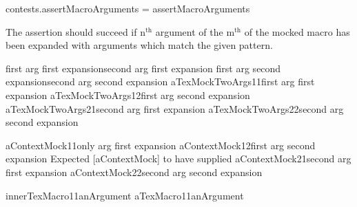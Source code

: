 contests.assertMacroArguments = assertMacroArguments
\stopLuaCode


The \type{\assertMacroNthArgumentOnMthExpansionMatches} assertion should 
succeed if $\text{n}^{\text{th}}$ argument of the $\text{m}^{\text{th}}$ 
of the mocked macro has been expanded with arguments which match the given 
pattern. 

\startConTest
\begingroup
  \aTexMockTwoArgs%
    {first arg first expansion}{second arg first expansion}
  \aTexMockTwoArgs%
    {first arg second expansion}{second arg second expansion}
  \assertMacroNthArgumentOnMthExpansionMatches%
    {aTexMockTwoArgs}{1}{1}{first arg first expansion}{}
  \assertMacroNthArgumentOnMthExpansionMatches%
    {aTexMockTwoArgs}{1}{2}{first arg second expansion}{}
  \assertMacroNthArgumentOnMthExpansionMatches%
    {aTexMockTwoArgs}{2}{1}{second arg first expansion}{}
  \assertMacroNthArgumentOnMthExpansionMatches%
    {aTexMockTwoArgs}{2}{2}{second arg second expansion}{}
\endgroup
\stopConTest
\stopTestCase

\startConTest
\begingroup
  \assertMacroNthArgumentOnMthExpansionMatches%
    {aContextMock}{1}{1}{only arg first expansion}{}
  \assertMacroNthArgumentOnMthExpansionMatches%
    {aContextMock}{1}{2}{first arg second expansion}{}
  \startAssertShouldFail{}%
    {Expected [aContextMock] to have supplied}%
    {}
    \assertMacroNthArgumentOnMthExpansionMatches%
      {aContextMock}{2}{1}{second arg first expansion}{}
  \stopAssertShouldFail
  \assertMacroNthArgumentOnMthExpansionMatches%
    {aContextMock}{2}{2}{second arg second expansion}{}
\endgroup
\stopConTest
\stopTestCase


\startConTest
\begingroup
  \def\aTexMacro#1{\innerTexMacro{#1}}
  \aTexMacro{anArgument}
  \assertMacroNthArgumentOnMthExpansionMatches%
    {innerTexMacro}{1}{1}{anArgument}{}
  \assertMacroNthArgumentOnMthExpansionMatches%
    {aTexMacro}{1}{1}{anArgument}{}
\endgroup
\stopConTest
\stopTestCase

\stopTestSuite

